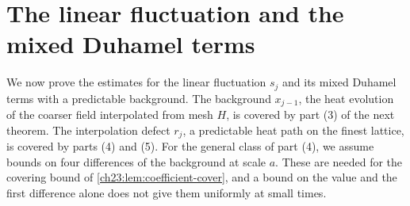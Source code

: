 \section{The linear fluctuation and the mixed Duhamel terms}\label{ch23:sec:linear}

We now prove the estimates for the linear fluctuation $s_j$ and its mixed Duhamel terms with a predictable background. The background $x_{j-1}$, the heat evolution of the coarser field interpolated from mesh $H$, is covered by part (3) of the next theorem. The interpolation defect $r_j$, a predictable heat path on the finest lattice, is covered by parts (4) and (5). For the general class of part (4), we assume bounds on four differences of the background at scale $a$. These are needed for the covering bound of \cref{ch23:lem:coefficient-cover}, and a bound on the value and the first difference alone does not give them uniformly at small times.

